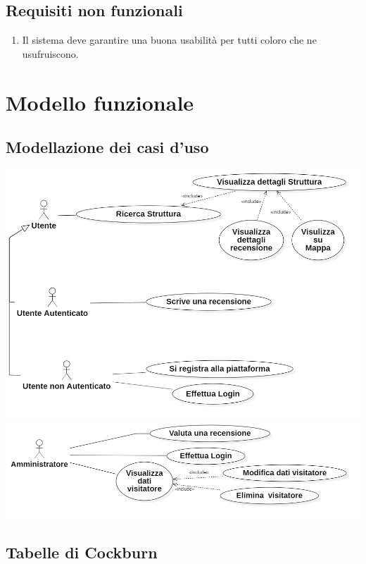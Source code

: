 \section{Requisiti non funzionali}
\begin{enumerate}
    \item Il sistema deve garantire una buona usabilità per tutti coloro che ne usufruiscono.
\end{enumerate}
\chapter{Modello funzionale}

\section{Modellazione dei casi d'uso}

\includegraphics[scale=0.4]{Usecase/ucd2.png}
\includegraphics[scale=0.4]{Usecase/ucd1.png}


\section{Tabelle di Cockburn}
